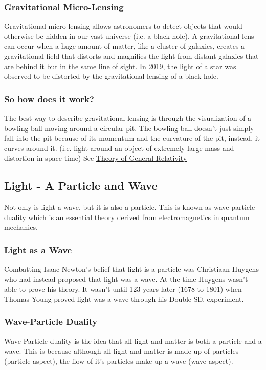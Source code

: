 \documentclass{article}
\begin{document}
\subsubsection{Gravitational Micro-Lensing}
Gravitational micro-lensing allows astronomers to detect objects that would otherwise be hidden in our vast universe (i.e. a black hole). A gravitational lens can occur when a huge amount of matter, like a cluster of galaxies, creates a gravitational field that distorts and magnifies the light from distant galaxies that are behind it but in the same line of sight. In 2019, the light of a star was observed to be distorted by the gravitational lensing of a black hole.

\subsubsection{So how does it work?}
The best way to describe gravitational lensing is through the visualization of a bowling ball moving around a circular pit. The bowling ball doesn't just simply fall into the pit because of its momentum and the curvature of the pit, instead, it curves around it. (i.e. light around an object of extremely large mass and distortion in space-time) See \hyperref[sec:generalrelativity]{Theory of General Relativity}

\subsection{Light - A Particle and Wave}
Not only is light a wave, but it is also a particle. This is known as wave-particle duality which is an essential theory derived from electromagnetics in quantum mechanics.

\subsubsection{Light as a Wave}
Combatting Isaac Newton's belief that light is a particle was Christiaan Huygens who had instead proposed that light was a wave. At the time Huygens wasn't able to prove his theory. It wasn't until 123 years later (1678 to 1801) when Thomas Young proved light was a wave through his Double Slit experiment.

\subsubsection{Wave-Particle Duality}
Wave-Particle duality is the idea that all light and matter is both a particle and a wave. This is because although all light and matter is made up of particles (particle aspect), the flow of it's particles make up a wave (wave aspect).
\end{document}
